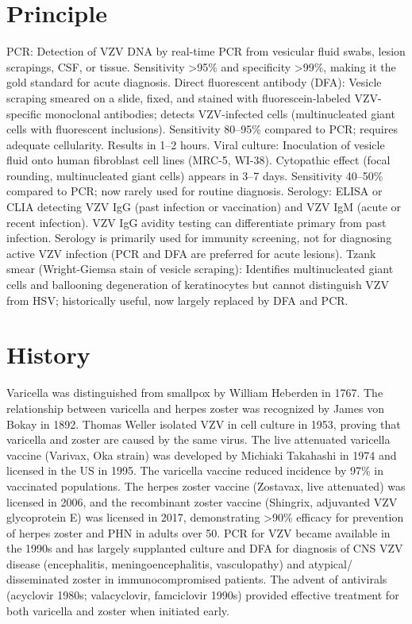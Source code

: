\section*{Principle}
PCR: Detection of VZV DNA by real-time PCR from vesicular fluid swabs, lesion scrapings, CSF, or tissue. Sensitivity >95\% and specificity >99\%, making it the gold standard for acute diagnosis. Direct fluorescent antibody (DFA): Vesicle scraping smeared on a slide, fixed, and stained with fluorescein-labeled VZV-specific monoclonal antibodies; detects VZV-infected cells (multinucleated giant cells with fluorescent inclusions). Sensitivity 80--95\% compared to PCR; requires adequate cellularity. Results in 1--2 hours. Viral culture: Inoculation of vesicle fluid onto human fibroblast cell lines (MRC-5, WI-38). Cytopathic effect (focal rounding, multinucleated giant cells) appears in 3--7 days. Sensitivity 40--50\% compared to PCR; now rarely used for routine diagnosis. Serology: ELISA or CLIA detecting VZV IgG (past infection or vaccination) and VZV IgM (acute or recent infection). VZV IgG avidity testing can differentiate primary from past infection. Serology is primarily used for immunity screening, not for diagnosing active VZV infection (PCR and DFA are preferred for acute lesions). Tzank smear (Wright-Giemsa stain of vesicle scraping): Identifies multinucleated giant cells and ballooning degeneration of keratinocytes but cannot distinguish VZV from HSV; historically useful, now largely replaced by DFA and PCR.

\section*{History}
Varicella was distinguished from smallpox by William Heberden in 1767. The relationship between varicella and herpes zoster was recognized by James von Bokay in 1892. Thomas Weller isolated VZV in cell culture in 1953, proving that varicella and zoster are caused by the same virus. The live attenuated varicella vaccine (Varivax, Oka strain) was developed by Michiaki Takahashi in 1974 and licensed in the US in 1995. The varicella vaccine reduced incidence by 97\% in vaccinated populations. The herpes zoster vaccine (Zostavax, live attenuated) was licensed in 2006, and the recombinant zoster vaccine (Shingrix, adjuvanted VZV glycoprotein E) was licensed in 2017, demonstrating >90\% efficacy for prevention of herpes zoster and PHN in adults over 50. PCR for VZV became available in the 1990s and has largely supplanted culture and DFA for diagnosis of CNS VZV disease (encephalitis, meningoencephalitis, vasculopathy) and atypical/ disseminated zoster in immunocompromised patients. The advent of antivirals (acyclovir 1980s; valacyclovir, famciclovir 1990s) provided effective treatment for both varicella and zoster when initiated early.

